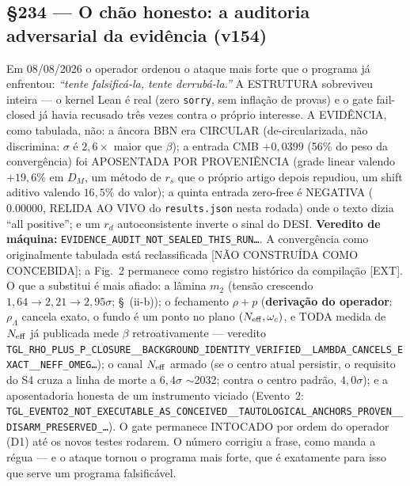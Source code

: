 \documentclass[11pt]{article}
\theoremstyle{definition}\newtheorem{deriv}{Derivação}
\begin{document}
\subsection*{\S234 --- O chão honesto: a auditoria adversarial da evidência (v154)}Em 08/08/2026 o operador ordenou o ataque mais forte que o programa já enfrentou: \emph{``tente falsificá-la, tente derrubá-la.''} A ESTRUTURA sobreviveu inteira --- o kernel Lean é real (zero \texttt{sorry}, sem inflação de provas) e o gate fail-closed já havia recusado três vezes contra o próprio interesse. A EVIDÊNCIA, como tabulada, não: a âncora BBN era CIRCULAR (de-circularizada, não discrimina: $\sigma$ é $2{,}6\times$ maior que $\beta$); a entrada CMB $+0{,}0399$ (56\% do peso da convergência) foi APOSENTADA POR PROVENIÊNCIA (grade linear valendo $+19{,}6\%$ em $D_M$, um método de $r_s$ que o próprio artigo depois repudiou, um shift aditivo valendo $16{,}5\%$ do valor); a quinta entrada zero-free é NEGATIVA ($0.00000$, RELIDA AO VIVO do \texttt{results.json} nesta rodada) onde o texto dizia ``all positive''; e um $r_d$ autoconsistente inverte o sinal do DESI. \textbf{Veredito de máquina:} \texttt{EVIDENCE\_AUDIT\_NOT\_SEALED\_THIS\_RUN\ldots}. A convergência como originalmente tabulada está reclassificada [NÃO CONSTRUÍDA COMO CONCEBIDA]; a Fig.~2 permanece como registro histórico da compilação [EXT]. O que a substitui é mais afiado: a lâmina $m_2$ (tensão crescendo $1{,}64\to2{,}21\to2{,}95\sigma$; \S~(ii-b)); o fechamento $\rho{+}p$ (\textbf{derivação do operador}: $\rho_\Lambda$ cancela exato, o fundo é um ponto no plano $(N_{\rm eff},\omega_c)$, e TODA medida de $N_{\rm eff}$ já publicada mede $\beta$ retroativamente --- veredito \texttt{TGL\_RHO\_PLUS\_P\_CLOSURE\_\_BACKGROUND\_IDENTITY\_VERIFIED\_\_LAMBDA\_CANCELS\_EXACT\_\_NEFF\_OMEG\ldots}); o canal $N_{\rm eff}$ armado (se o centro atual persistir, o requisito do S4 cruza a linha de morte a $6{,}4\sigma$ $\sim$2032; contra o centro padrão, $4{,}0\sigma$); e a aposentadoria honesta de um instrumento viciado (Evento~2: \texttt{TGL\_EVENTO2\_NOT\_EXECUTABLE\_AS\_CONCEIVED\_\_TAUTOLOGICAL\_ANCHORS\_PROVEN\_\_DISARM\_PRESERVED\_\ldots}). O gate permanece INTOCADO por ordem do operador (D1) até os novos testes rodarem. O número corrigiu a frase, como manda a régua --- e o ataque tornou o programa mais forte, que é exatamente para isso que serve um programa falsificável.
\end{document}
